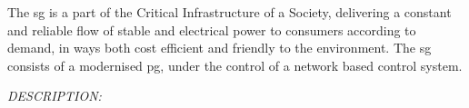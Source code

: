 The \acrshort{sg} is a part of the Critical Infrastructure of a Society, delivering a constant and reliable flow of stable and electrical power to consumers according to demand, in ways both cost efficient and friendly to the environment. The \acrshort{sg} consists of a modernised \acrshort{pg}, under the control of a network based control system. 


\textit{DESCRIPTION:}
\textbf{\cite{kumar2015monitoring}  }

